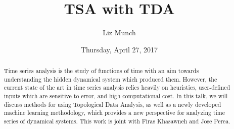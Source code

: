\documentclass{UAmathtalk}
\author{Liz Munch}
\title{TSA with TDA}
\date{Thursday, April 27, 2017}
\begin{document}
\maketitle

\begin{abstract}
Time series analysis is the study of functions of time with an aim towards understanding the hidden dynamical system which produced them.  However, the current state of the art in time series analysis relies heavily on heuristics, user-defined inputs which are sensitive to error, and high computational cost.  In this talk, we will discuss methods for using Topological Data Analysis, as well as a newly developed machine learning methodology, which provides a new perspective for analyzing time series of dynamical systems. This work is joint with Firas Khasawneh and Jose Perea.
\end{abstract}
\end{document}
